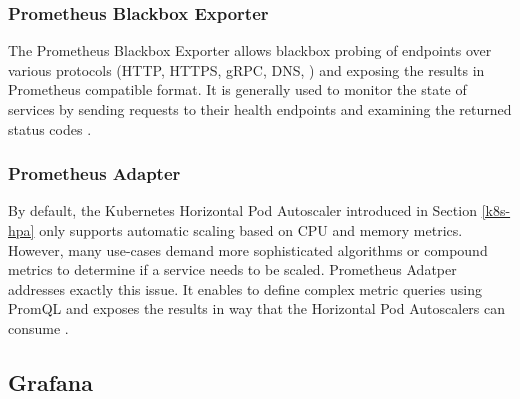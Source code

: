 \subsubsection{Prometheus Blackbox Exporter}

The Prometheus Blackbox Exporter allows blackbox probing of endpoints over various protocols (HTTP, HTTPS, gRPC, DNS, \etc) and exposing the results in Prometheus compatible format. It is generally used to monitor the state of services by sending requests to their health endpoints and examining the returned status codes \cite{PrometheusBlackboxExporter}. 


\subsubsection{Prometheus Adapter}

By default, the Kubernetes Horizontal Pod Autoscaler introduced in Section \ref{k8s-hpa} only supports automatic scaling based on CPU and memory metrics. However, many use-cases demand more sophisticated algorithms or compound metrics to determine if a service needs to be scaled. Prometheus Adatper addresses exactly this issue. It enables to define complex metric queries using PromQL and exposes the results in way that the Horizontal Pod Autoscalers can consume \cite{PrometheusAdapter}.

\subsection{Grafana}

